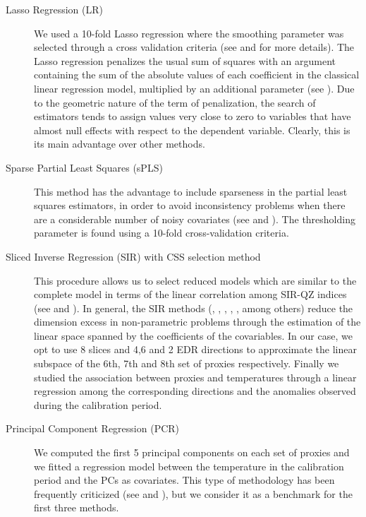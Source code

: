 \documentclass[11pt]{amsart}
\theoremstyle{plain}
\theoremstyle{definition}
\theoremstyle{remark}
\begin{document}
\begin{description}
\item[Lasso Regression (LR)]
We used a 10-fold Lasso regression where the smoothing parameter was selected
through a cross validation criteria (see \cite{Tibshirani1996} and \cite{Friedman2010} for more details). %
 The Lasso regression penalizes the usual sum of squares with an argument
 containing the sum of the absolute values of each coefficient in the classical
 linear regression model, multiplied by an additional parameter (see \cite{Tibshirani1996}). Due
 to the geometric nature of the term of penalization, the search of estimators
 tends to assign values very close to zero to variables that have almost null
 effects with respect to the dependent variable. Clearly, this is its main advantage
 over other methods.
\item[Sparse Partial Least Squares (sPLS)] 
  This method has the advantage to include sparseness in the partial least squares
  estimators, in order to avoid inconsistency problems when there are a
  considerable number of noisy covariates (see \cite{Chun2010} and \cite{Chung2013}). The
  thresholding parameter is found using a 10-fold cross-validation criteria.    
\item[Sliced Inverse Regression (SIR) with CSS selection method]
  This procedure allows us to select reduced models which are similar to the
  complete model in terms of the linear correlation among SIR-QZ indices (see
  \cite{Coudret2014} and \cite{Coudret2017}). In general, the SIR methods (\cite{Li1991},
  \cite{Duan1991}, \cite{Zhong2005}, \cite{Li2008}, \cite{Coudret2014}, \cite{Weisberg2002} among
  others) reduce the dimension excess in non-parametric problems through the
  estimation of the linear space spanned by the coefficients of the covariables.
  In our case, we opt to use 8 slices and 4,6 and 2 EDR directions to approximate the linear
  subspace of the 6th, 7th and 8th set of proxies respectively. Finally we studied the association between proxies and temperatures
  through a linear regression among the corresponding directions and the anomalies observed
  during the calibration period. 
\item[Principal Component Regression (PCR)]
We computed the first 5 principal components on each set of proxies and we fitted a
regression model between the temperature in the calibration period and the PCs
as covariates. This type of methodology has been frequently criticized (see
\cite{Jolliffe1982} and \cite{Tibshirani1996}),
but we consider it as a benchmark for the first three methods. 
\end{description}
\end{document}
